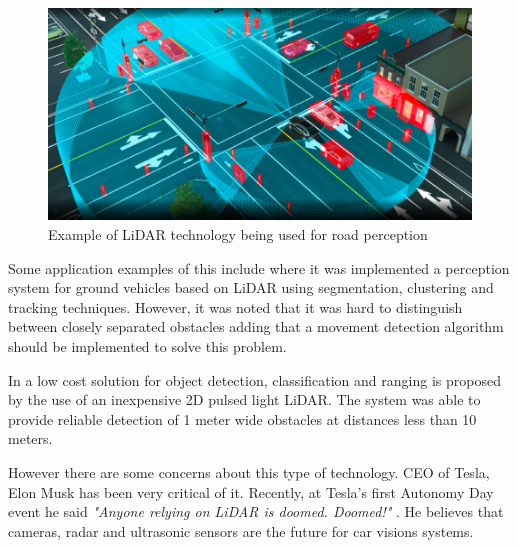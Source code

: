  
\begin{figure}[h] 
\centerline{\includegraphics [width=0.7 \textwidth]{imgs/chapter2/lidarcar.png}}
\caption{Example of \ac{LiDAR} technology being used for road perception \cite{lidarcar}}
\label{fig:lidarcar}
\end{figure}

Some application examples of this include \cite{lidarperception}  where it was implemented a perception system for ground vehicles based on \ac{LiDAR} using segmentation, clustering and tracking techniques.  However, it was noted that it was hard to distinguish between closely  separated obstacles adding that a movement detection algorithm should be implemented to solve this problem. 

In \cite{car2dlidar} a low cost solution for object detection, classification and ranging is  proposed by the use of an inexpensive 2D pulsed light \ac{LiDAR}. The system was able to provide reliable detection of 1 meter wide obstacles at distances less than 10 meters.


However there are some concerns about this type of technology. CEO of Tesla, Elon Musk has been very critical of it. Recently, at Tesla’s first Autonomy Day event  he said \textit{"Anyone relying on \ac{LiDAR} is doomed. Doomed!"} \cite{elon}. He believes that cameras, radar and ultrasonic sensors are the future for car visions systems. 
